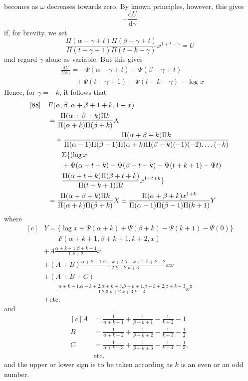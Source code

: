 becomes as $\omega$ decreases towards zero. By known principles, however, this gives
\[
-\frac{\mathrm{d}U}{\mathrm{d}\gamma}
\]
if, for brevity, we set
\[
\frac{\Pi(\alpha-\gamma+t)\Pi(\beta-\gamma+t)}{\Pi(t-\gamma+1)\Pi(t-k-\gamma)}x^{1+t-\gamma}=U
\]
and regard $\gamma$ alone as variable. But this gives
\[
\begin{aligned}&\frac{\mathrm{d}U}{U\mathrm{d}\gamma}
=-\Psi(\alpha-\gamma+t)-\Psi(\beta-\gamma+t)\\&\qquad+\Psi(t-\gamma+1)+\Psi(t-k-\gamma)-\log x\end{aligned}
\]
Hence, for $\gamma=-k$, it follows that
\[
\begin{aligned}[c]
[88]\quad &F(\alpha,\beta,\alpha+\beta+1+k,1-x)\\
&=\frac{\Pi(\alpha+\beta+k)\Pi k}{\Pi(\alpha+k)\Pi(\beta+k)}X\\
&\quad+\frac{\Pi(\alpha+\beta+k)\Pi k}{\Pi(\alpha-1)\Pi(\beta-1)\Pi(\alpha+k)\Pi(\beta+k)(-1)(-2)\ldotp\ldotp\ldotp\ldotp(-k)}\\&\qquad\Sigma\{(\log x\\
&\qquad+\Psi(\alpha+t+k)+\Psi(\beta+t+k)-\Psi(t+k+1)-\Psi t)
\\&\qquad\frac{\Pi(\alpha+t+k)\Pi(\beta+t+k)}{\Pi(t+k+1)\Pi t}x^{1+t+k}\}\\
&=\frac{\Pi(\alpha+\beta+k)\Pi k}{\Pi(\alpha+k)\Pi(\beta+k)}X
\pm\frac{\Pi(\alpha+\beta+k)x^{1+k}}{\Pi(\alpha-1)\Pi(\beta-1)\Pi(k+1)}Y
\end{aligned}
\]
where
\[
\begin{aligned}[c]
&Y=\{\log x+\Psi(\alpha+k)+\Psi(\beta+k)-\Psi(k+1)-\Psi(0)\}\\&\qquad F(\alpha+k+1,\beta+k+1,k+2,x)\\
&+A\frac{\alpha+k+1.\beta+k+1}{1. k+2}x\\
&+(A+B)\frac{\alpha+k+1.\alpha+k+2.\beta+k+1.\beta+k+2}{1.2. k+2. k+3}xx\\
&+(A+B+C)\\&\qquad\frac{\alpha+k+1.\alpha+k+2.\alpha+k+3.\beta+k+1.\beta+k+2.\beta+k+3}{1.2.3. k+2. k+3. k+4}x^3\\
&+\text{etc.}
\end{aligned}
\]
and
\[
\begin{aligned}[c]
A&=\frac{1}{\alpha+k+1}+\frac{1}{\beta+k+1}-\frac{1}{k+2}-1\\
B&=\frac{1}{\alpha+k+2}+\frac{1}{\beta+k+2}-\frac{1}{k+3}-\frac12\\
C&=\frac{1}{\alpha+k+3}+\frac{1}{\beta+k+3}-\frac{1}{k+4}-\frac13,\\
&\text{etc.}
\end{aligned}
\]
and the upper or lower sign is to be taken according as $k$ is an even or an odd number.

